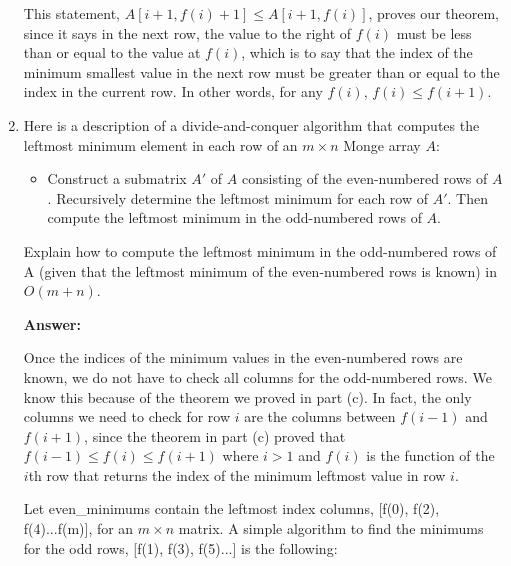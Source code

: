 \documentclass[]{book}
\theoremstyle{definition}
\begin{document}
\begin{enumerate}[label=\alph*.]
    This statement, $A[i+1, f(i)+1] \leq A[i+1, f(i)]$, proves our theorem, since it says 
    in the next row, the value to the right of $f(i)$ must be less than or equal to the value
    at $f(i)$, which is to say that the index of the minimum smallest value in the next row
    must be greater than or equal to the index in the current row. In other words, for any
    $f(i)$, $f(i) \leq f(i+1)$.

    \item Here is a description of a divide-and-conquer algorithm that computes the leftmost minimum
          element in each row of an $m \times n$ Monge array $A$:
          \begin{itemize}
            \item Construct a submatrix $A'$ of $A$ consisting of the even-numbered rows of $A$.
                  Recursively determine the leftmost minimum for each row of $A'$.
                  Then compute the leftmost minimum in the odd-numbered rows of $A$.
          \end{itemize}
          Explain how to compute the leftmost minimum in the odd-numbered rows of A
          (given that the leftmost minimum of the even-numbered rows is known) in $O(m+n)$.

    \textbf{Answer:} 

          Once the indices of the minimum values in the even-numbered rows
          are known, we do not have to check all columns for the odd-numbered rows.
          We know this because of the theorem we proved in part (c). In fact,
          the only columns we need to check for row $i$ are the columns
          between $f(i-1)$ and $f(i+1)$, since the theorem in part (c) proved
          that $f(i-1) \leq f(i) \leq f(i+1)$ where $i>1$ and $f(i)$ is the
          function of the $i$th row that returns the index of the minimum leftmost value in
          row $i$.

          Let even\_minimums contain the leftmost index columns, [f(0), f(2), f(4)...f(m)], for 
          an $m \times n$ matrix. A simple algorithm to find the
          minimums for the odd rows, [f(1), f(3), f(5)...] is the following:


\end{enumerate}
\end{document}
